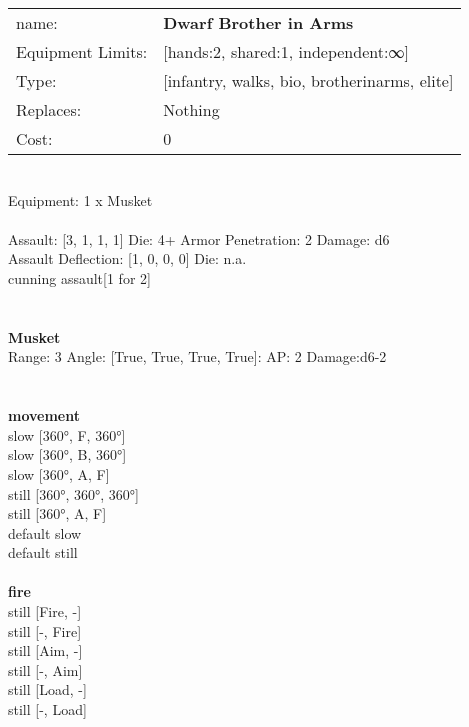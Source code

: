 \noindent
\begin{tabular}{ll}
name: &{\bf Dwarf Brother in Arms } \\
Equipment Limits: &[hands:2, shared:1, independent:∞] \\
Type: &[infantry, walks, bio, brotherinarms, elite] \\
Replaces: &Nothing \\
Cost: & 0\\
\end{tabular}
\ \\
Equipment: 1 x Musket \\
\ \\
Assault: [3, 1, 1, 1] Die: 4+ Armor Penetration: 2 Damage: d6 \\
Assault Deflection: [1, 0, 0, 0] Die: n.a.\\
\indent cunning assault[1 for 2]\\ 
 
\ \\

\ \\
{\bf Musket } \\



Range: 3  Angle: [True, True, True, True]: AP: 2 Damage:d6-2 \\




 
\ \\



\ \\ {\bf movement } \\
slow [360°, F, 360°] \\
slow [360°, B, 360°] \\
slow [360°, A, F] \\
still [360°, 360°, 360°] \\
still [360°, A, F] \\
default slow \\
default still \\
\ \\ {\bf fire } \\
still [Fire, -] \\
still [-, Fire] \\
still [Aim, -] \\
still [-, Aim] \\
still [Load, -] \\
still [-, Load] \\


